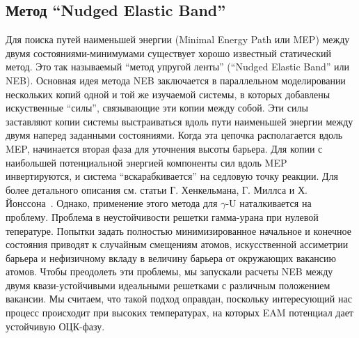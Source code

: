 \documentclass[master,14pt,subf,href,colorlinks=true
]{disser}
\begin{document}
\subsection{Метод ``Nudged Elastic Band''}
Для поиска путей наименьшей энергии (Minimal Energy Path или MEP) между двумя состояниями-минимумами существует хорошо известный статический метод. Это так называемый ``метод упругой ленты'' (``Nudged Elastic Band'' или NEB).
Основная идея метода NEB заключается в параллельном моделировании нескольких копий одной и той же изучаемой системы, в которых добавлены искуственные ``силы'', связывающие эти копии между собой. Эти силы заставляют копии системы выстраиваться вдоль пути наименьшей энергии между двумя наперед заданными состояниями. Когда эта цепочка располагается вдоль MEP, начинается вторая фаза для уточнения высоты барьера. Для копии с наибольшей потенциальной энергией компоненты сил вдоль MEP инвертируются, и система ``вскарабкивается'' на седловую точку реакции. Для более детального описания см. статьи Г. Хенкельмана, Г. Миллса и Х. Йонссона~\cite{NEB_1994, NEB_1995, CI_NEB_2000}.
Однако, применение этого метода для $\gamma$-U наталкивается на проблему.
Проблема в неустойчивости решетки гамма-урана при нулевой тепературе. Попытки задать полностью минимизированное начальное и конечное состояния приводят к случайным смещениям атомов, искусственной ассиметрии барьера и нефизичному вкладу в величину барьера от окружающих вакансию атомов. Чтобы преодолеть эти проблемы, мы запускали расчеты NEB между двумя квази-устойчивыми идеальными решетками с различным положением вакансии. Мы считаем, что такой подход оправдан, поскольку интересующий нас процесс происходит при высоких температурах, на которых EAM потенциал дает устойчивую ОЦК-фазу.
\end{document}
